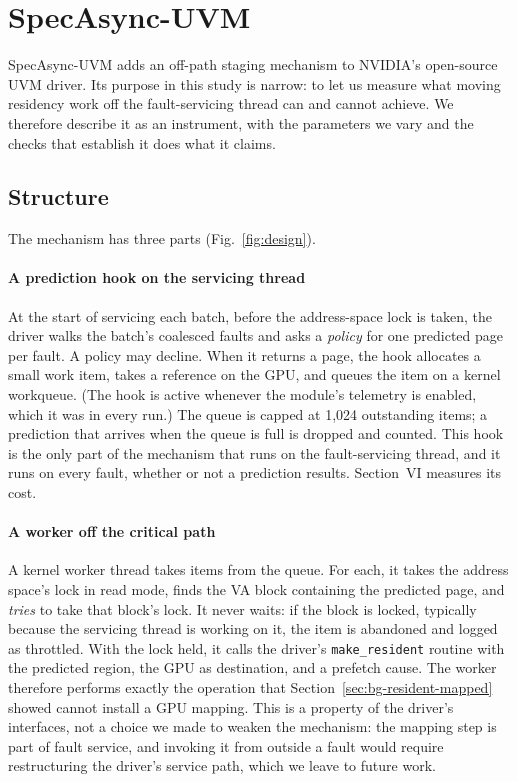 \section{SpecAsync-UVM}
\label{sec:design}

SpecAsync-UVM adds an off-path staging mechanism to NVIDIA's open-source UVM
driver. Its purpose in this study is narrow: to let us measure what moving
residency work off the fault-servicing thread can and cannot achieve. We
therefore describe it as an instrument, with the parameters we vary and the
checks that establish it does what it claims.

\subsection{Structure}
\label{sec:design-structure}

The mechanism has three parts (Fig.~\ref{fig:design}).

\paragraph{A prediction hook on the servicing thread}
At the start of servicing each batch, before the address-space lock is
taken, the driver walks the batch's coalesced faults and asks a
\emph{policy} for one predicted page per fault. A policy may decline. When it
returns a page, the hook allocates a small work item, takes a reference on the
GPU, and queues the item on a kernel workqueue. (The hook is active whenever the
module's telemetry is enabled, which it was in every run.) The queue is capped at 1{,}024
outstanding items; a prediction that arrives when the queue is full is
dropped and counted. This hook is the only part of the mechanism that runs on
the fault-servicing thread, and it runs on every fault, whether or not a
prediction results. Section~VI measures its cost.

\paragraph{A worker off the critical path}
A kernel worker thread takes items from the queue. For each, it takes the
address space's lock in read mode, finds the VA block containing the
predicted page, and \emph{tries} to take that block's lock. It never waits:
if the block is locked, typically because the servicing thread is working on
it, the item is abandoned and logged as throttled. With the lock held, it
calls the driver's \texttt{make\_resident} routine with the predicted region,
the GPU as destination, and a prefetch cause. The worker therefore performs
exactly the operation that Section~\ref{sec:bg-resident-mapped} showed cannot
install a GPU mapping. This is a property of the driver's interfaces, not a
choice we made to weaken the mechanism: the mapping step is part of fault
service, and invoking it from outside a fault would require restructuring the
driver's service path, which we leave to future work.

